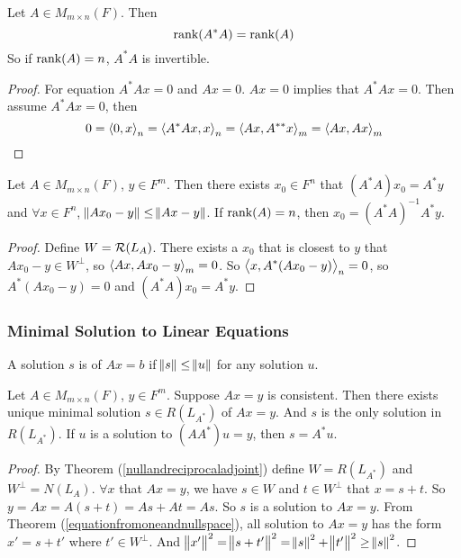 \begin{theorem}
    Let $A \in M_{m\times n} (F)$. Then
    \begin{equation}
        \displaystyle \text{rank}( A^*A ) = \displaystyle \text{rank}( A )
    \end{equation}
    So if $\displaystyle \text{rank}( A ) = n$, $A^*A$ is invertible.
\end{theorem}
\begin{proof}
    For equation $A^*Ax = 0$ and $Ax = 0$. $Ax=0$ implies that $A^*Ax =0$. Then assume $A^*Ax = 0$, then
    \begin{equation*}
        0 = \left\langle \displaystyle 0, x \right\rangle_n = \left\langle \displaystyle A^*Ax, x \right\rangle_n = \left\langle \displaystyle Ax, A^{**}x \right\rangle_m = \left\langle \displaystyle Ax, Ax \right\rangle_m
    \end{equation*}
\end{proof}


\begin{theorem}
    Let $A \in M_{m\times n} (F)$, $y \in F^m$. Then there exists $x_0 \in F^n$ that $(A^*A) x_0 = A^* y$ and $\forall x \in F^n$, $ \norm{Ax_0 - y} \leq \norm{Ax-y}$. If $\displaystyle \text{rank}( A ) = n$, then $x_0 = (A^*A)^{-1} A^* y$.
\end{theorem}
\begin{proof}
    Define $W=\mathcal{R}(L_A)$. There exists a $x_0$ that is closest to $y$ that $Ax_0 - y \in W^\bot$, so $\left\langle \displaystyle Ax, Ax_0 - y \right\rangle_m = 0$. So $\left\langle \displaystyle x, A^*(Ax_0 - y) \right\rangle_n = 0$, so $A^*(Ax_0 - y) = 0$ and $(A^*A) x_0 = A^* y$. 
\end{proof}




\subsubsection{Minimal Solution to Linear Equations}

\begin{definition}
    A solution $s$ is  of $Ax=b$ if $\norm{s} \leq \norm{u}$ for any solution $u$.
\end{definition}



\begin{theorem}
    Let $A \in M_{m\times n} (F)$, $y \in F^m$. Suppose $Ax=y$ is consistent. Then there exists unique minimal solution $s \in R(L_{A^*})$ of $Ax=y$. And $s$ is the only solution in $R(L_{A^*})$. If $u$ is a solution to $(AA^*) u = y$, then $s = A^* u$.
\end{theorem}
\begin{proof}
    By Theorem (\ref{nullandreciprocaladjoint}) define $W = R(L_{A^*})$ and $W^\bot = N(L_A)$. $\forall x$ that $Ax = y$, we have $s \in W$ and $t \in W^\bot$ that $x=s+t$. So $y = Ax = A(s + t) = As + At = As$. So $s$ is a solution to $Ax=y$. From Theorem (\ref{equationfromoneandnullspace}), all solution to $Ax=y$ has the form $x' = s + t'$ where $t' \in W^\bot$. And $\norm{x'}^2 = \norm{s + t'}^2 = \norm{s}^2 + \norm{t'}^2 \geq \norm{s}^2$.
\end{proof}







